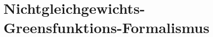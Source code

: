 \section{Nichtgleichgewichts-Greensfunktions-Formalismus}
\label{cha:nichtgleichgewichtsgreensfunktionsformalismus}
